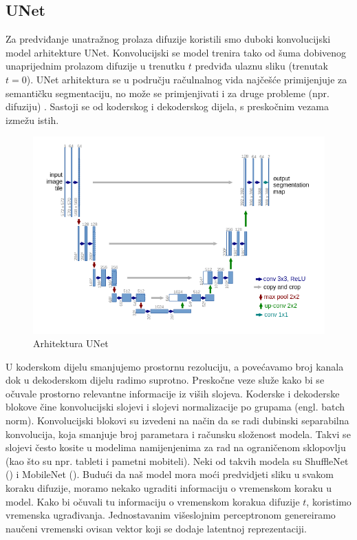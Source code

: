 \documentclass[10pt, a4paper, croatian]{article}
\begin{document}
\subsection{UNet}
Za predviđanje unatražnog prolaza difuzije koristili smo duboki konvolucijski model arhitekture UNet. Konvolucijski se model trenira tako od šuma dobivenog unaprijednim prolazom difuzije u trenutku $t$ predviđa ulaznu sliku (trenutak $t = 0$).
UNet arhitektura se u području račulnalnog vida najčešće primijenjuje za semantičku segmentaciju, no može se primjenjivati i za druge probleme (npr. difuziju) \cite{unet}.
Sastoji se od koderskog i dekoderskog dijela, s preskočnim vezama izmežu istih.
\begin{figure}
	\begin{center}
	\includegraphics[width=\columnwidth]{images/unet.png}
	\caption{Arhitektura UNet\cite{unet}}
	\label{fig:figure1}
	\end{center}
\end{figure}
U koderskom dijelu smanjujemo prostornu rezoluciju, a povećavamo broj kanala dok u dekoderskom dijelu radimo suprotno. 
Preskočne veze služe kako bi se očuvale prostorno relevantne informacije iz viših slojeva. Koderske i dekoderske blokove čine konvolucijski slojevi i slojevi normalizacije po grupama (engl. batch norm).
Konvolucijski blokovi su izvedeni na način da se radi dubinski separabilna konvolucija, koja smanjuje broj parametara i računsku složenost modela. 
Takvi se slojevi često kosite u modelima namijenjenima za rad na ograničenom sklopovlju (kao što su npr. tableti i pametni mobiteli).
Neki od takvih modela su ShuffleNet (\cite{zhang2017shufflenetextremelyefficientconvolutional}) i MobileNet (\cite{howard2017mobilenetsefficientconvolutionalneural}).
Budući da naš model mora moći predvidjeti sliku u svakom koraku difuzije, moramo nekako ugraditi informaciju o vremenskom koraku u model.
Kako bi očuvali tu informaciju o vremenskom korakua difuzije $t$, koristimo vremenska ugrađivanja.
Jednostavanim višeslojnim perceptronom genereiramo naučeni vremenski ovisan vektor koji se dodaje latentnoj reprezentaciji.
\end{document}
